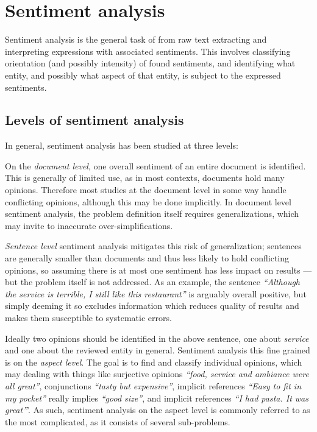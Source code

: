 \documentclass[a4paper,11pt]{kth-mag}
\begin{document}


\section{Sentiment analysis}
Sentiment analysis\cite{liu2012sentiment} is the general task of from raw text extracting and interpreting expressions with associated sentiments. This involves classifying orientation (and possibly intensity) of found sentiments, and identifying what entity, and possibly what aspect of that entity, is subject to the expressed sentiments.

\subsection{Levels of sentiment analysis}
In general, sentiment analysis has been studied at three levels:

On the \emph{document level}, one overall sentiment of an entire document is identified. This is generally of limited use, as in most contexts, documents hold many opinions. Therefore most studies at the document level in some way handle conflicting opinions, although this may be done implicitly\cite[Chapter~3]{liu2012sentiment}. In document level sentiment analysis, the problem definition itself requires generalizations, which may invite to inaccurate over-simplifications.

\emph{Sentence level} sentiment analysis mitigates this risk of generalization; sentences are generally smaller than documents and thus less likely to hold conflicting opinions, so assuming there is at most one sentiment has less impact on results --- but the problem itself is not addressed. As an example, the sentence \emph{``Although the service is terrible, I still like this restaurant''} is arguably overall positive, but simply deeming it so excludes information which reduces quality of results and makes them susceptible to systematic errors.

Ideally two opinions should be identified in the above sentence, one about \emph{service} and one about the reviewed entity in general. Sentiment analysis this fine grained is on the \emph{aspect level}. The goal is to find and classify individual opinions, which may  dealing with things like surjective opinions \emph{``food, service and ambiance were all great''}, conjunctions \emph{``tasty but expensive''}, implicit references \emph{``Easy to fit in my pocket''} really implies \emph{``good size''}, and implicit references \emph{``I had pasta. It was great''}'. As such, sentiment analysis on the aspect level is commonly referred to as the most complicated, as it consists of several sub-problems\cite[chapter 1]{liu2012sentiment}.
\end{document}
